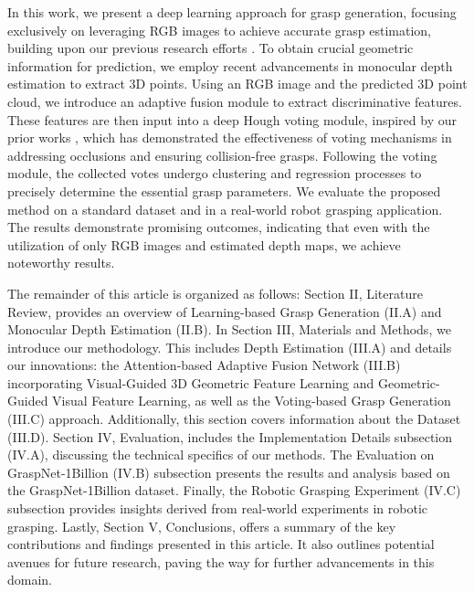 In this work, we present a deep learning approach for grasp generation, focusing exclusively on leveraging RGB images to achieve accurate grasp estimation, building upon our previous research efforts \cite{hoang2023grasp, hoang2022context}. To obtain crucial geometric information for prediction, we employ recent advancements in monocular depth estimation to extract 3D points. Using an RGB image and the predicted 3D point cloud, we introduce an adaptive fusion module to extract discriminative features. These features are then input into a deep Hough voting module, inspired by our prior works \cite{hoang2023grasp, hoang2022context}, which has demonstrated the effectiveness of voting mechanisms in addressing occlusions and ensuring collision-free grasps. Following the voting module, the collected votes undergo clustering and regression processes to precisely determine the essential grasp parameters. We evaluate the proposed method on a standard dataset and in a real-world robot grasping application. The results demonstrate promising outcomes, indicating that even with the utilization of only RGB images and estimated depth maps, we achieve noteworthy results.

The remainder of this article is organized as follows: Section II, Literature Review, provides an overview of Learning-based Grasp Generation (II.A) and Monocular Depth Estimation (II.B). In Section III, Materials and Methods, we introduce our methodology. This includes Depth Estimation (III.A) and details our innovations: the Attention-based Adaptive Fusion Network (III.B) incorporating Visual-Guided 3D Geometric Feature Learning and Geometric-Guided Visual Feature Learning, as well as the Voting-based Grasp Generation (III.C) approach. Additionally, this section covers information about the Dataset (III.D). Section IV, Evaluation, includes the Implementation Details subsection (IV.A), discussing the technical specifics of our methods. The Evaluation on GraspNet-1Billion (IV.B) subsection presents the results and analysis based on the GraspNet-1Billion dataset. Finally, the Robotic Grasping Experiment (IV.C) subsection provides insights derived from real-world experiments in robotic grasping. Lastly, Section V, Conclusions, offers a summary of the key contributions and findings presented in this article. It also outlines potential avenues for future research, paving the way for further advancements in this domain.